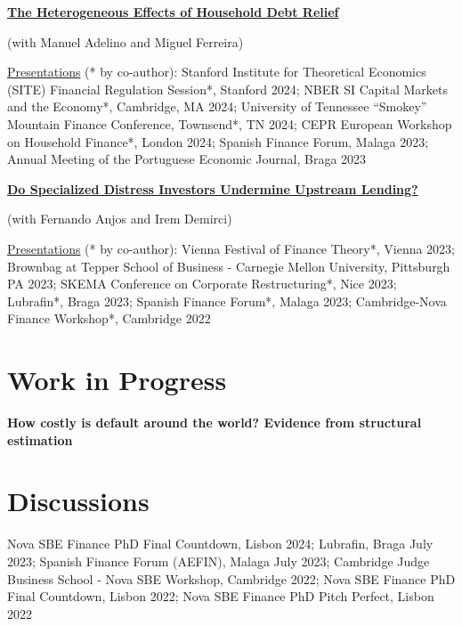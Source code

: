 \documentclass[letterpaper]{article}
\newenvironment{itemize*}{
  \begin{list}{}{
    \setlength{\leftmargin}{1.5em}
  }
}{
  \end{list}
}
\begin{document}
\begin{itemize*}
\item \href{https://miguelcfoliveira.github.io/Papers/Homemade_Unleverage.pdf}{\color{blue}\textbf{The Heterogeneous Effects of Household Debt Relief}}

	(with Manuel Adelino and Miguel Ferreira)
	
	\underline{Presentations} (* by co-author): Stanford Institute for Theoretical Economics (SITE) Financial Regulation Session*, Stanford 2024; NBER SI Capital Markets and the Economy*, Cambridge, MA 2024; University of Tennessee ``Smokey'' Mountain Finance Conference, Townsend*, TN 2024; CEPR European Workshop on Household Finance*, London 2024; Spanish Finance Forum, Malaga 2023; Annual Meeting of the Portuguese Economic Journal, Braga 2023
\medskip
	
\item \href{https://papers.ssrn.com/sol3/papers.cfm?abstract_id=4395807}{\color{blue}\textbf{Do Specialized Distress Investors Undermine Upstream Lending?}}

	(with Fernando Anjos and Irem Demirci)

	\underline{Presentations} (* by co-author): Vienna Festival of Finance Theory*, Vienna 2023; Brownbag at Tepper School of Business - Carnegie Mellon University, Pittsburgh PA 2023; SKEMA Conference on Corporate Restructuring*, Nice 2023; Lubrafin*, Braga 2023; Spanish Finance Forum*, Malaga 2023; Cambridge-Nova Finance Workshop*, Cambridge 2022
\end{itemize*}

\section*{Work in Progress}
\vspace{-0.2in}
\hrulefill

\begin{itemize*}
\item \textbf{How costly is default around the world? Evidence from structural estimation}
\end{itemize*}

\section*{Discussions}
\vspace{-0.2in}
\hrulefill
\begin{itemize*}
\item Nova SBE Finance PhD Final Countdown, Lisbon 2024; Lubrafin, Braga July 2023; Spanish Finance Forum (AEFIN), Malaga July 2023; Cambridge Judge Business School - Nova SBE Workshop,  Cambridge 2022; Nova SBE Finance PhD Final Countdown, Lisbon 2022; Nova SBE Finance PhD Pitch Perfect, Lisbon 2022
\end{itemize*}
\end{document}
